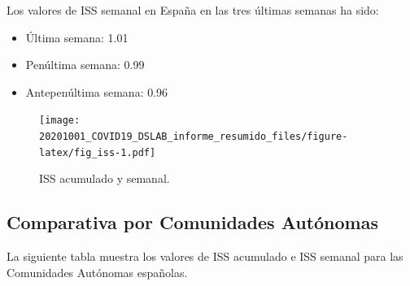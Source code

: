 \documentclass[
  11pt,
]{article}
\providecommand{\tightlist}{%
  \setlength{\itemsep}{0pt}\setlength{\parskip}{0pt}}
\begin{document}
Los valores de ISS semanal en España en las tres últimas semanas ha
sido:

\begin{itemize}
\tightlist
\item
  Última semana: 1.01
\item
  Penúltima semana: 0.99
\item
  Antepenúltima semana: 0.96
\end{itemize}

\vspace{0.2cm}

\begin{figure}
\centering
\texttt{[image: 20201001\_COVID19\_DSLAB\_informe\_resumido\_files/figure-latex/fig\_iss-1.pdf]}
\caption{\label{fig:fig_iss} ISS acumulado y semanal.}
\end{figure}

\clearpage

\hypertarget{comparativa-por-comunidades-autuxf3nomas}{%
\subsection{Comparativa por Comunidades
Autónomas}\label{comparativa-por-comunidades-autuxf3nomas}}

La siguiente tabla muestra los valores de ISS acumulado e ISS semanal
para las Comunidades Autónomas españolas. \vspace{0.2cm}
\end{document}
